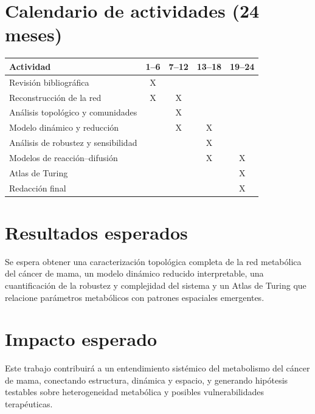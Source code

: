 \documentclass[12pt,spanish]{article}
\begin{document}
	\section{Calendario de actividades (24 meses)}
	
	\begin{longtable}{lcccc}
		\toprule
		\textbf{Actividad} & \textbf{1--6} & \textbf{7--12} & \textbf{13--18} & \textbf{19--24} \\
		\midrule
		Revisión bibliográfica & X &  &  &  \\
		Reconstrucción de la red & X & X &  &  \\
		Análisis topológico y comunidades &  & X &  &  \\
		Modelo dinámico y reducción &  & X & X &  \\
		Análisis de robustez y sensibilidad &  &  & X &  \\
		Modelos de reacción--difusión &  &  & X & X \\
		Atlas de Turing &  &  &  & X \\
		Redacción final &  &  &  & X \\
		\bottomrule
	\end{longtable}
	
	\section{Resultados esperados}
	
	Se espera obtener una caracterización topológica completa de la red metabólica del cáncer de mama, un modelo dinámico reducido interpretable, una cuantificación de la robustez y complejidad del sistema y un Atlas de Turing que relacione parámetros metabólicos con patrones espaciales emergentes.
	
	\section{Impacto esperado}
	
	Este trabajo contribuirá a un entendimiento sistémico del metabolismo del cáncer de mama, conectando estructura, dinámica y espacio, y generando hipótesis testables sobre heterogeneidad metabólica y posibles vulnerabilidades terapéuticas.
	
\end{document}

